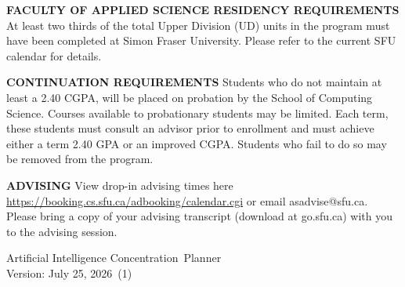 \documentclass[11pt]{article}
\newcommand{\ConcentrationName}{Artificial Intelligence Concentration}
\newcommand{\PlannerVersionDate}{July 25, 2026}
\begin{document}
\vspace{6pt}
\textbf{FACULTY OF APPLIED SCIENCE RESIDENCY REQUIREMENTS} At least two
thirds of the total Upper Division (UD) units in the program must have been
completed at Simon Fraser University. Please refer to the current SFU
calendar for details.

\vspace{6pt}
\textbf{CONTINUATION REQUIREMENTS} Students who do not maintain at least a
2.40 CGPA, will be placed on probation by the School of Computing Science.
Courses available to probationary students may be limited. Each term, these
students must consult an advisor prior to enrollment and must achieve either
a term 2.40 GPA or an improved CGPA. Students who fail to do so may be
removed from the program.

\vspace{6pt}
\textbf{ADVISING} View drop-in advising times here
\url{https://booking.cs.sfu.ca/adbooking/calendar.cgi} or email
asadvise@sfu.ca. Please bring a copy of your advising transcript (download at
go.sfu.ca) with you to the advising session.

\vspace{10pt}
\ConcentrationName\ Planner\\
Version: \PlannerVersionDate\ (1)
\end{document}
